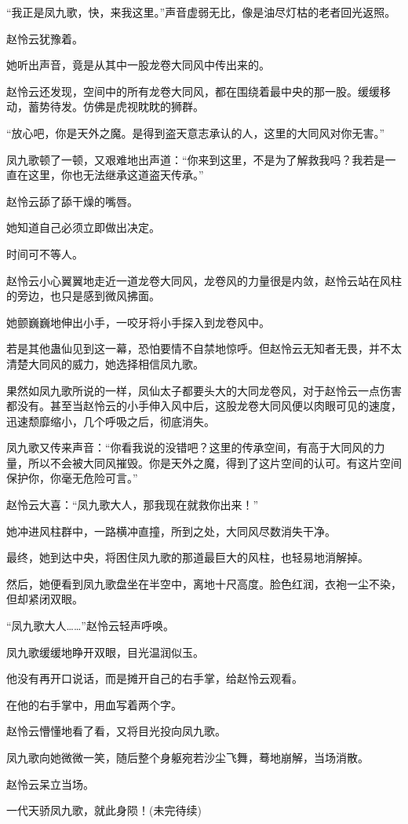 \begin{this_body}
“我正是凤九歌，快，来我这里。”声音虚弱无比，像是油尽灯枯的老者回光返照。

赵怜云犹豫着。

她听出声音，竟是从其中一股龙卷大同风中传出来的。

赵怜云还发现，空间中的所有龙卷大同风，都在围绕着最中央的那一股。缓缓移动，蓄势待发。仿佛是虎视眈眈的狮群。

“放心吧，你是天外之魔。是得到盗天意志承认的人，这里的大同风对你无害。”

凤九歌顿了一顿，又艰难地出声道：“你来到这里，不是为了解救我吗？我若是一直在这里，你也无法继承这道盗天传承。”

赵怜云舔了舔干燥的嘴唇。

她知道自己必须立即做出决定。

时间可不等人。

赵怜云小心翼翼地走近一道龙卷大同风，龙卷风的力量很是内敛，赵怜云站在风柱的旁边，也只是感到微风拂面。

她颤巍巍地伸出小手，一咬牙将小手探入到龙卷风中。

若是其他蛊仙见到这一幕，恐怕要情不自禁地惊呼。但赵怜云无知者无畏，并不太清楚大同风的威力，她选择相信凤九歌。

果然如凤九歌所说的一样，凤仙太子都要头大的大同龙卷风，对于赵怜云一点伤害都没有。甚至当赵怜云的小手伸入风中后，这股龙卷大同风便以肉眼可见的速度，迅速颓靡缩小，几个呼吸之后，彻底消失。

凤九歌又传来声音：“你看我说的没错吧？这里的传承空间，有高于大同风的力量，所以不会被大同风摧毁。你是天外之魔，得到了这片空间的认可。有这片空间保护你，你毫无危险可言。”

赵怜云大喜：“凤九歌大人，那我现在就救你出来！”

她冲进风柱群中，一路横冲直撞，所到之处，大同风尽数消失干净。

最终，她到达中央，将困住凤九歌的那道最巨大的风柱，也轻易地消解掉。

然后，她便看到凤九歌盘坐在半空中，离地十尺高度。脸色红润，衣袍一尘不染，但却紧闭双眼。

“凤九歌大人……”赵怜云轻声呼唤。

凤九歌缓缓地睁开双眼，目光温润似玉。

他没有再开口说话，而是摊开自己的右手掌，给赵怜云观看。

在他的右手掌中，用血写着两个字。

赵怜云懵懂地看了看，又将目光投向凤九歌。

凤九歌向她微微一笑，随后整个身躯宛若沙尘飞舞，蓦地崩解，当场消散。

赵怜云呆立当场。

一代天骄凤九歌，就此身陨！(未完待续)

\end{this_body}

